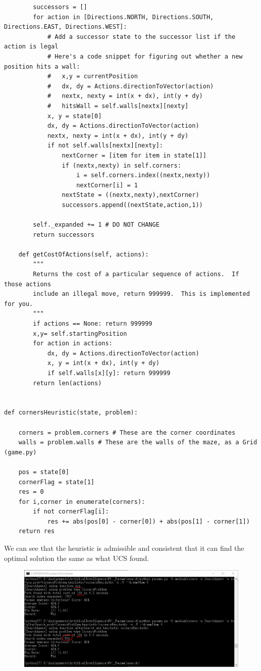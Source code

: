 \documentclass[a4paper, 11pt]{article}
\begin{document}
\begin{lstlisting}
        successors = []
        for action in [Directions.NORTH, Directions.SOUTH, Directions.EAST, Directions.WEST]:
            # Add a successor state to the successor list if the action is legal
            # Here's a code snippet for figuring out whether a new position hits a wall:
            #   x,y = currentPosition
            #   dx, dy = Actions.directionToVector(action)
            #   nextx, nexty = int(x + dx), int(y + dy)
            #   hitsWall = self.walls[nextx][nexty]
            x, y = state[0]
            dx, dy = Actions.directionToVector(action)
            nextx, nexty = int(x + dx), int(y + dy)
            if not self.walls[nextx][nexty]:
                nextCorner = [item for item in state[1]]
                if (nextx,nexty) in self.corners:
                    i = self.corners.index((nextx,nexty))
                    nextCorner[i] = 1
                nextState = ((nextx,nexty),nextCorner)
                successors.append((nextState,action,1))

        self._expanded += 1 # DO NOT CHANGE
        return successors

    def getCostOfActions(self, actions):
        """
        Returns the cost of a particular sequence of actions.  If those actions
        include an illegal move, return 999999.  This is implemented for you.
        """
        if actions == None: return 999999
        x,y= self.startingPosition
        for action in actions:
            dx, dy = Actions.directionToVector(action)
            x, y = int(x + dx), int(y + dy)
            if self.walls[x][y]: return 999999
        return len(actions)


def cornersHeuristic(state, problem):

    corners = problem.corners # These are the corner coordinates
    walls = problem.walls # These are the walls of the maze, as a Grid (game.py)

    pos = state[0]
    cornerFlag = state[1]
    res = 0
    for i,corner in enumerate(corners):
        if not cornerFlag[i]:
            res += abs(pos[0] - corner[0]) + abs(pos[1] - corner[1])
    return res
\end{lstlisting}

We can see that the heuristic is admissible and consistent that it can find the optimal solution the same as what UCS found.
\begin{figure}[H]
  \centering
  \includegraphics[width=\linewidth]{fig/Q2.png}
\end{figure}
\end{document}
